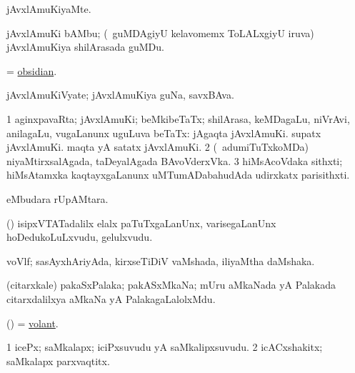 \bentry 
{} 
\gl{\kirxvi}
\expl{}
\bmng
 jAvxlAmuKiyaMte. 
\emng
\eentry

\bentry 
{}
\gl{\nA}
\expl{}
\bmng
 jAvxlAmuKi bAMbu; (\sA\ guMDAgiyU kelavomemx ToLALxgiyU iruva) jAvxlAmuKiya shilArasada guMDu. 
\emng
\eentry

\bentry 
{} 
\gl{\nA}
\expl{}
\bmng
 = \hyperref{kandict_o.pdf}{O}{obsidian}{obsidian}. 
\emng
\eentry

\bentry
{} 
\gl{\nA}
\expl{}
\bmng
 jAvxlAmuKiVyate; jAvxlAmuKiya guNa, savxBAva. 
\emng
\eentry

\bentry 
{} 
\gl{\nA}
\bmng
\bnum
\num{1} aginxpavaRta; jAvxlAmuKi; beMkibeTaTx; shilArasa, keMDagaLu, niVrAvi, anilagaLu, \mo vugaLanunx uguLuva beTaTx:  jAgaqta jAvxlAmuKi.  supatx jAvxlAmuKi.  maqta yA satatx jAvxlAmuKi. 
\num{2} (\kanmu\ adumiTuTxkoMDa) niyaMtirxsalAgada, taDeyalAgada BAvoVderxVka. 
\num{3} hiMsAcoVdaka sithxti; hiMsAtamxka kaqtayxgaLanunx uMTumADabahudAda udirxkatx parisithxti. 
\enum
\emng
\eentry

\bentry
{} 
\gl{\nA}
\expl{}
\bmng
  eMbudara rUpAMtara. 
\emng
\eentry

\bentry 
{} 
\gl{\nA}
\expl{}
\bmng
 (\pArxparx) isipxVTATadalilx elalx paTuTxgaLanUnx, varisegaLanUnx hoDedukoLuLxvudu, gelulxvudu. 
\emng
\eentry

\bentry 
{} 
\gl{\nA}
\expl{}
\bmng
 voVlf; sasAyxhAriyAda, kirxseTiDiV vaMshada, iliyaMtha daMshaka.  
\emng
\eentry

\bentry
{} 
\gl{\nA}
\expl{}
\bmng
 (citarxkale) pakaSxPalaka; pakASxMkaNa; mUru aMkaNada yA Palakada citarxdalilxya aMkaNa yA PalakagaLalolxMdu. 
\emng
\eentry

\bentry 
{} 
\gl{\gu}
\expl{}
\bmng
 (\pArxvi) = \hyperlink{volant}{volant}. 
\emng
\eentry

\bentry
{} 
\gl{\nA}
\expl{}
\bmng
\bnum
\num{1} icePx; saMkalapx; iciPxsuvudu yA saMkalipxsuvudu. 
\num{2} icACxshakitx; saMkalapx parxvaqtitx. 
\enum
\emng

